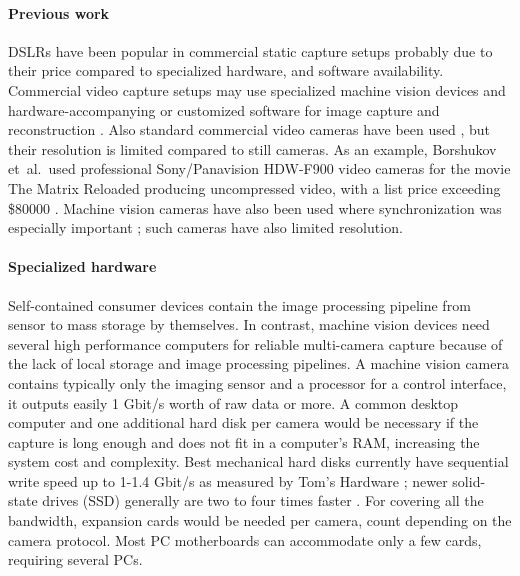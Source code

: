 \paragraph{Previous work}
DSLRs have been popular in commercial static capture setups \cite{ir-ltd,ten24,capturelab,agisoftforum,winder2008technical} probably due to their price compared to specialized hardware, and software availability.
Commercial video capture setups may use specialized machine vision devices and hardware-accompanying or customized software for image capture and reconstruction \cite{al2013new}.
Also standard commercial video cameras have been used \cite{bradley2010high}, but their resolution is limited compared to still cameras.
As an example, Borshukov et~al.\ used professional Sony/Panavision HDW-F900 video cameras for the movie The Matrix Reloaded \cite{borshukov05universal} producing uncompressed video, with a list price exceeding \$80000 \cite{sonyhdwf900r}.
Machine vision cameras have also been used where synchronization was especially important \cite{carceroni2002multi,bickel2007multi}; such cameras have also limited resolution.

\paragraph{Specialized hardware}
Self-contained consumer devices contain the image processing pipeline from sensor to mass storage by themselves.
In contrast, machine vision devices need several high performance computers for reliable multi-camera capture because of the lack of local storage and image processing pipelines.
A machine vision camera contains typically only the imaging sensor and a processor for a control interface, it outputs easily 1 Gbit/s worth of raw data or more.
A common desktop computer and one additional hard disk per camera would be necessary if the capture is long enough and does not fit in a computer's RAM, increasing the system cost and complexity.
Best mechanical hard disks currently have sequential write speed up to 1-1.4 Gbit/s as measured by Tom's Hardware \cite{tomshw-hddwrite};
newer solid-state drives (SSD) generally are two to four times faster \cite{tomshw-ssdwrite}.
For covering all the bandwidth, expansion cards would be needed per camera, count depending on the camera protocol.
Most PC motherboards can accommodate only a few cards, requiring several PCs.


